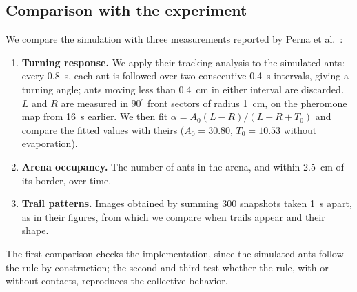 \documentclass[9pt,twoside]{pnas-new}
\begin{document}
\subsection{Comparison with the experiment}
We compare the simulation with three measurements reported by Perna et al.\ \cite{perna2012}:
\begin{enumerate}
    \item \textbf{Turning response.} We apply their tracking analysis to the simulated ants: every 0.8~s, each ant is followed over two consecutive 0.4~s intervals, giving a turning angle; ants moving less than 0.4~cm in either interval are discarded. $L$ and $R$ are measured in $90^\circ$ front sectors of radius 1~cm, on the pheromone map from 16~s earlier. We then fit $\alpha = A_0 (L-R)/(L+R+T_0)$ and compare the fitted values with theirs ($A_0 = 30.80$, $T_0 = 10.53$ without evaporation).
    \item \textbf{Arena occupancy.} The number of ants in the arena, and within 2.5~cm of its border, over time.
    \item \textbf{Trail patterns.} Images obtained by summing 300 snapshots taken 1~s apart, as in their figures, from which we compare when trails appear and their shape.
\end{enumerate}
The first comparison checks the implementation, since the simulated ants follow the rule by construction; the second and third test whether the rule, with or without contacts, reproduces the collective behavior.
\end{document}
